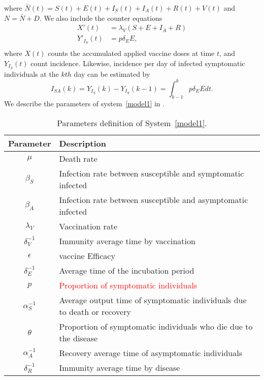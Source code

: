 where $\bar{N}(t)=S(t)+E(t)+I_S(t)+I_A(t)+R(t)+V(t)$ and
$N=\bar{N}+D$.
We also include the counter equations
\begin{equation}
    \label{eqn:model1_counters}
    \begin{aligned}
        X'(t) &=
            \lambda_V(S + E + I_A + R)
        \\
        Y'_{I_S}(t) &=p
            \delta_E E,
        \\
    \end{aligned}
\end{equation}
where $X(t)$ counts the accumulated applied vaccine doses at
time $t$, and $Y_{I_S}(t)$ count incidence.
Likewise, incidence per day of
infected symptomatic individuals at the $kth$ day can be estimated by
\begin{equation*}
    I_{SA}(k) = Y_{I_S}(k) - Y_{I_S}(k-1)=\int_{k-1}^k p\delta_EE dt.
\end{equation*}
We describe the parameters of system~\eqref{model1} in .
%
\begin{table}[h!]
\centering
    \begin{tabular}{cl}
        \toprule
        Parameter & Description
        \\
        \midrule
            $\mu$ &  Death rate
        \\
            $\beta_S$
            & Infection rate between susceptible and symptomatic
            infected
        \\
            $\beta_A$
            &
            Infection rate between susceptible and asymptomatic
            infected
        \\
            $\lambda_V$
            & Vaccination rate
        \\
            $\delta_{V}^{-1}$
            & Immunity average time by vaccination
        \\
            $\epsilon$
            & vaccine Efficacy
        \\
            $\delta_{E}^{-1}$
            &
            Average time of the incubation period
        \\
            $p$
            & \textcolor{red}{Proportion of symptomatic individuals}
        \\
            $\alpha_{S}^{-1}$
            &  Average output time of symptomatic individuals
            due to death or recovery
        \\
            $\theta$
            & Proportion of symptomatic individuals
             who die due to the disease
        \\
            $\alpha_{A}^{-1}$
            & Recovery average time of asymptomatic
            individuals
        \\
            $\delta_{R}^{-1}$
            & Immunity average time by disease
        \\
        \bottomrule
    \end{tabular}
    \caption{Parameters definition of System~\eqref{model1}.}
    \label{table1}
\end{table}
